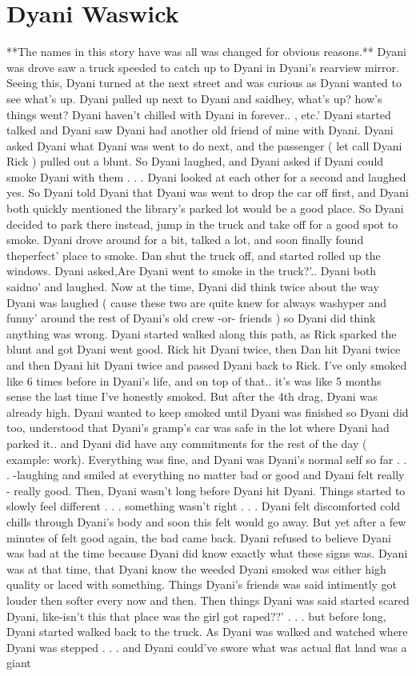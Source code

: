 \documentclass[12pt]{book}
\begin{document}
\chapter{Dyani Waswick}

**The names in this story have was all was changed for obvious reasons.** Dyani was drove saw a truck speeded to catch up to Dyani in Dyani's rearview mirror. Seeing this, Dyani turned at the next street and was curious as Dyani wanted to see what's up. Dyani pulled up next to Dyani and saidhey, what's up? how's things went? Dyani haven't chilled with Dyani in forever.. , etc.' Dyani started talked and Dyani saw Dyani had another old friend of mine with Dyani. Dyani asked Dyani what Dyani was went to do next, and the passenger ( let call Dyani Rick ) pulled out a blunt. So Dyani laughed, and Dyani asked if Dyani could smoke Dyani with them . . .  Dyani looked at each other for a second and laughed yes. So Dyani told Dyani that Dyani was went to drop the car off first, and Dyani both quickly mentioned the library's parked lot would be a good place. So Dyani decided to park there instead, jump in the truck and take off for a good spot to smoke. Dyani drove around for a bit, talked a lot, and soon finally found theperfect' place to smoke. Dan shut the truck off, and started rolled up the windows. Dyani asked,Are Dyani went to smoke in the truck?'.. Dyani both saidno' and laughed. Now at the time, Dyani did think twice about the way Dyani was laughed ( cause these two are quite knew for always washyper and funny' around the rest of Dyani's old crew -or- friends ) so Dyani did think anything was wrong. Dyani started walked along this path, as Rick sparked the blunt and got Dyani went good. Rick hit Dyani twice, then Dan hit Dyani twice and then Dyani hit Dyani twice and passed Dyani back to Rick. I've only smoked like 6 times before in Dyani's life, and on top of that.. it's was like 5 months sense the last time I've honestly smoked. But after the 4th drag, Dyani was already high. Dyani wanted to keep smoked until Dyani was finished so Dyani did too, understood that Dyani's gramp's car was safe in the lot where Dyani had parked it.. and Dyani did have any commitments for the rest of the day ( example: work). Everything was fine, and Dyani was Dyani's normal self so far . . .  -laughing and smiled at everything no matter bad or good and Dyani felt really - really good. Then, Dyani wasn't long before Dyani hit Dyani. Things started to slowly feel different  . . .  something wasn't right . . .  Dyani felt discomforted cold chills through Dyani's body and soon this felt would go away. But yet after a few minutes of felt good again, the bad came back. Dyani refused to believe Dyani was bad at the time because Dyani did know exactly what these signs was. Dyani was at that time, that Dyani know the weeded Dyani smoked was either high quality or laced with something. Things Dyani's friends was said intimently got louder then softer every now and then. Then things Dyani was said started scared Dyani, like-isn't this that place was the girl got raped??' . . .  but before long, Dyani started walked back to the truck. As Dyani was walked and watched where Dyani was stepped  . . .  and Dyani could've swore what was actual flat land was a giant 
\end{document}
